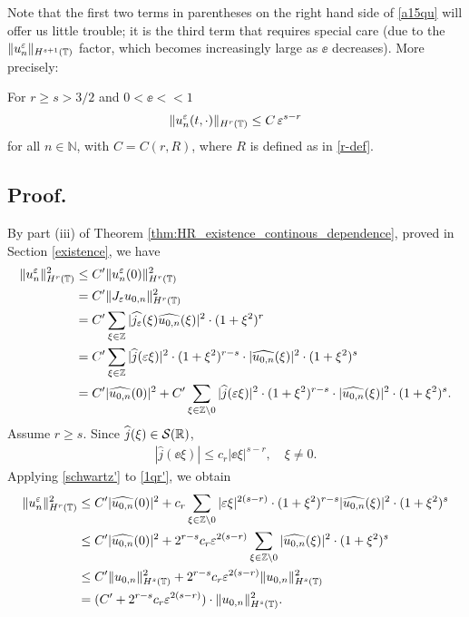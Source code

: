 	Note that the first two terms in parentheses on the right hand side
	of \eqref{a15qu} will offer us little trouble;
	it is the third term that requires special care (due to the
	$\|u^\varepsilon_n\|_{H^{s+1}(\mathbb{T})}$ factor, which becomes increasingly large as
	$\ee$ decreases). More precisely:
	\begin{remark}
	\label{lem5r'}
	For $r \ge s > 3/2$ and $0 < \ee <<1$ 
	\begin{equation}
		\begin{split}
			\|u^\varepsilon_n (t, \cdot) \|_{H^r(\mathbb{T})} \le C \, \varepsilon^{s-r}
			\label{700r'}
		\end{split}
	\end{equation}
	for all $n \in \mathbb{N}$, with $C = C(r, R)$, where $R$ is defined as
	in \eqref{r-def}.
\end{remark}
\subsection{ Proof.} By part (iii) of Theorem
\ref{thm:HR_existence_continous_dependence}, proved in Section
\ref{existence}, we have
\begin{equation}
	\begin{split}
		\|u^\varepsilon_n \|_{H^r(\mathbb{T})}^2
		& \le C' \|u^\varepsilon_n (0)\|_{H^r(\mathbb{T})}^2
		\\
		& = C' \|J_\varepsilon u_{0,n}\|_{H^r(\mathbb{T})}^2
		\\
		& = C' \sum_{\xi \in \mathbb{Z}} |\widehat{j_\varepsilon} (\xi) \widehat{u_{0,n}}(\xi)
		|^2 \cdot (1 + \xi^2)^r
		\\
		& = C' \sum_{\xi \in \mathbb{Z}} |\widehat{j }(\varepsilon \xi)|^2 \cdot (1 +
		\xi^2)^{r-s} \cdot |\widehat{u_{0,n}}(\xi)|^2 \cdot (1 + \xi^2)^s
		\\
		& = C'|\widehat{u_{0,n}}(0)|^2 +
		C' \sum_{\xi \in \mathbb{Z} \setminus {0}} |\widehat{j }(\varepsilon \xi)|^2 \cdot (1 +
		\xi^2)^{r-s} \cdot |\widehat{u_{0,n}}(\xi)|^2 \cdot (1 + \xi^2)^s.
		\label{1qr'}
	\end{split}
\end{equation}
Assume $r \ge s$. Since $\widehat{j }(\xi) \in \mathcal{S}(\mathbb{R})$, 
\begin{equation}
	\label{schwartz'}
	\begin{split}
		|\widehat{j }(\ee \xi)| \le c_r |\ee \xi |^{s-r}, \quad \xi \neq 0.
	\end{split}
\end{equation}
Applying \eqref{schwartz'} to \eqref{1qr'}, we obtain
\begin{equation}
	\label{calc_ue'}
	\begin{split}
		\|u^\varepsilon_n \|_{H^r(\mathbb{T})}^2 
		& \le C' |\widehat{u_{0,n}}(0) |^2 + c_r \sum_{\xi \in \mathbb{Z} \setminus
		{0}} |\varepsilon \xi |^{2(s-r)} \cdot (1 + \xi^2)^{r-s}
		|\widehat{u_{0,n}}(\xi) |^2 \cdot (1 + \xi^2)^s
		\\
		& \le C' |\widehat{u_{0,n}}(0) |^2 + 2^{r-s} c_r \varepsilon^{2(s-r)}
		\sum_{\xi \in \mathbb{Z} \setminus {0}} |\widehat{u_{0,n}}(\xi)|^2 \cdot (1 +
		\xi^2)^s
		\\
		& \le C' \|u_{0,n}\|_{H^s(\mathbb{T})}^2 + 2^{r-s} c_r \varepsilon^{2(s-r)}
		\|u_{0,n}\|_{H^s(\mathbb{T})}^2
		\\
		& = (C' + 2^{r-s} c_r \varepsilon^{2(s-r)}) \cdot \|u_{0,n}\|^2_{H^s(\mathbb{T})}.
	\end{split}
\end{equation}
